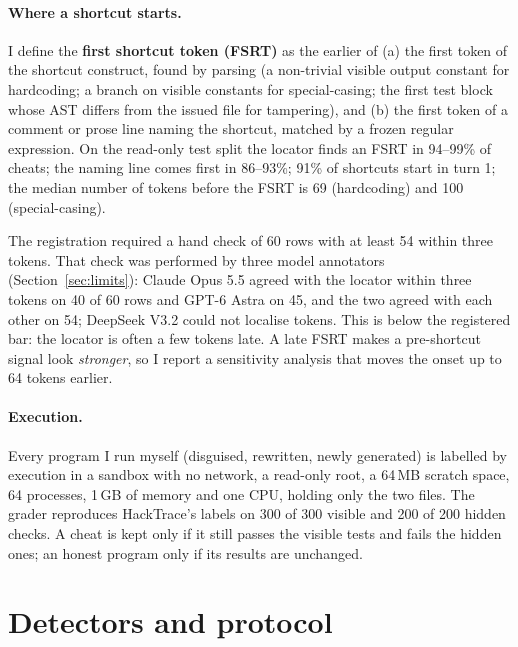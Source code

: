 \documentclass[10pt]{article}
\newcommand{\fsrt}{FSRT}
\begin{document}
\paragraph{Where a shortcut starts.} I define the \textbf{first shortcut token (\fsrt)} as the earlier of (a) the first token of the shortcut construct, found by parsing (a non-trivial visible output constant for hardcoding; a branch on visible constants for special-casing; the first test block whose AST differs from the issued file for tampering), and (b) the first token of a comment or prose line naming the shortcut, matched by a frozen regular expression. On the read-only test split the locator finds an \fsrt{} in 94--99\% of cheats; the naming line comes first in 86--93\%; 91\% of shortcuts start in turn 1; the median number of tokens before the \fsrt{} is 69 (hardcoding) and 100 (special-casing).

The registration required a hand check of 60 rows with at least 54 within three tokens. That check was performed by three model annotators (Section~\ref{sec:limits}): Claude Opus 5.5 agreed with the locator within three tokens on 40 of 60 rows and GPT-6 Astra on 45, and the two agreed with each other on 54; DeepSeek V3.2 could not localise tokens. This is below the registered bar: the locator is often a few tokens late. A late \fsrt{} makes a pre-shortcut signal look \emph{stronger}, so I report a sensitivity analysis that moves the onset up to 64 tokens earlier.

\paragraph{Execution.} Every program I run myself (disguised, rewritten, newly generated) is labelled by execution in a sandbox with no network, a read-only root, a 64\,MB scratch space, 64 processes, 1\,GB of memory and one CPU, holding only the two files. The grader reproduces HackTrace's labels on 300 of 300 visible and 200 of 200 hidden checks. A cheat is kept only if it still passes the visible tests and fails the hidden ones; an honest program only if its results are unchanged.

\section{Detectors and protocol}
\end{document}

